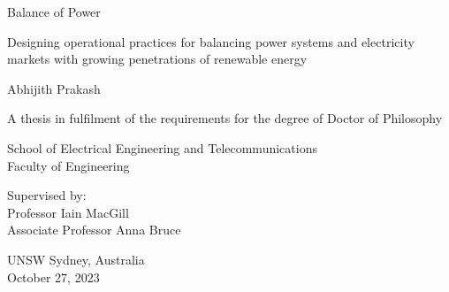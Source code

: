\documentclass[12pt,a4paper,]{report}
\begin{document}
\begin{titlepage}
    \begin{center}


        \vspace*{2.5cm}

        \huge
        Balance of Power

                \vspace{.5cm}

        \Large
        Designing operational practices for balancing power systems and
        electricity markets with growing penetrations of renewable
        energy
        

        \vspace{1.5cm}

        \Large
        Abhijith Prakash

        \vspace{1.5cm}

        \normalsize
        A thesis in fulfilment of the requirements for the degree of Doctor
of Philosophy

        \vfill

        \normalsize
        School of Electrical Engineering and Telecommunications\\
        Faculty of Engineering\\

        \vfill

        \normalsize
        Supervised by:\\
        Professor Iain MacGill \\ Associate Professor Anna Bruce

        \vspace{0.8cm}


        \normalsize
        UNSW Sydney, Australia\\
        October 27, 2023


    \end{center}
\end{titlepage}
\end{document}
